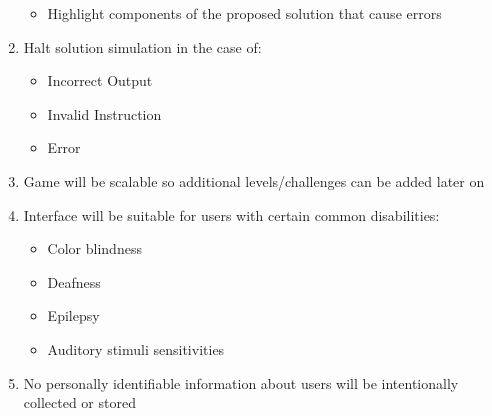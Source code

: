 \begin{enumerate}
\begin{itemize}
		\item Highlight components of the proposed solution that cause errors
		\end{itemize}
	\item Halt solution simulation in the case of:
		\begin{itemize}
		\item Incorrect Output
		\item Invalid Instruction
		\item Error
		\end{itemize}
	\item Game will be scalable so additional levels/challenges can be added later on
	\item Interface will be suitable for users with certain common disabilities:
		\begin{itemize}
		\item Color blindness
		\item Deafness
		\item Epilepsy
		\item Auditory stimuli sensitivities
		\end{itemize}
	\item No personally identifiable information about users will be intentionally 
		collected or stored
\end{enumerate}

